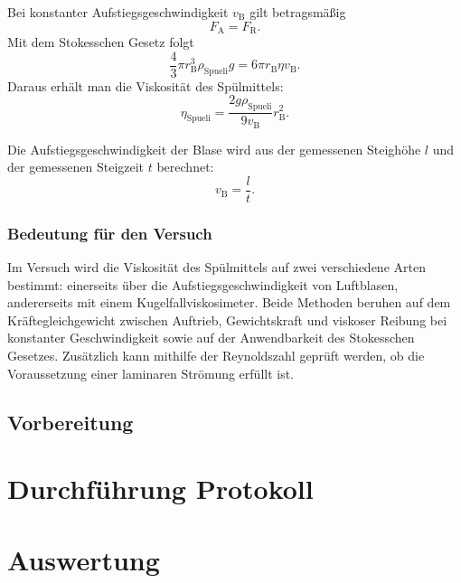 \documentclass{report}
\begin{document}
\noindent
Bei konstanter Aufstiegsgeschwindigkeit $v_\mathrm{B}$ gilt betragsmäßig
\begin{equation}
    F_\mathrm{A} = F_\mathrm{R}.
\end{equation}
Mit dem Stokesschen Gesetz folgt
\begin{equation}
    \frac{4}{3}\pi r_\mathrm{B}^3 \rho_\mathrm{Spueli} g
    = 6 \pi r_\mathrm{B} \eta v_\mathrm{B}.
\end{equation}
Daraus erhält man die Viskosität des Spülmittels:
\begin{equation}
    \eta_\mathrm{Spueli}
    = \frac{2 g \rho_\mathrm{Spueli}}{9 v_\mathrm{B}} r_\mathrm{B}^2.
\end{equation}

\noindent
Die Aufstiegsgeschwindigkeit der Blase wird aus der gemessenen Steighöhe $l$ und der
gemessenen Steigzeit $t$ berechnet:
\begin{equation}
    v_\mathrm{B} = \frac{l}{t}.
\end{equation}

\subsection{Bedeutung für den Versuch}



Im Versuch wird die Viskosität des Spülmittels auf zwei verschiedene Arten bestimmt:
einerseits über die Aufstiegsgeschwindigkeit von Luftblasen, andererseits mit einem
Kugelfallviskosimeter. Beide Methoden beruhen auf dem Kräftegleichgewicht zwischen
Auftrieb, Gewichtskraft und viskoser Reibung bei konstanter Geschwindigkeit sowie auf der
Anwendbarkeit des Stokesschen Gesetzes. Zusätzlich kann mithilfe der Reynoldszahl geprüft
werden, ob die Voraussetzung einer laminaren Strömung erfüllt ist.

\newpage
\section{Vorbereitung}


\newpage
\chapter{Durchführung Protokoll}



\newpage
\chapter{Auswertung}
\end{document}
